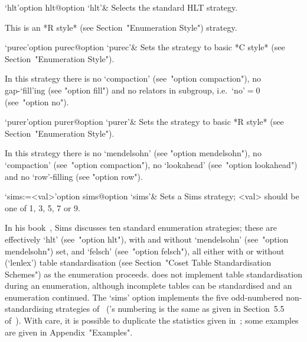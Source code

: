 \>`hlt'{option hlt}@{option `hlt'}&
Selects the standard HLT strategy.

This is an *R style* (see Section~"Enumeration Style") strategy.

\>`purec'{option purec}@{option `purec'}&
Sets the strategy to basic *C style* (see Section~"Enumeration  Style").

In this strategy there is no `compaction'  (see~"option  compaction"),
no gap-`fill'ing (see "option fill")  and  no  relators  in  subgroup,
i.e.~`no'${}=0$ (see~"option no").

\>`purer'{option purer}@{option `purer'}&
Sets the strategy  to basic *R style* (see Section~"Enumeration  Style").

In this strategy there is no `mendelsohn' (see  "option  mendelsohn"),
no `compaction' (see~"option compaction"), no `lookahead' (see~"option
lookahead") and no `row'-filling (see "option row").

\>`sims:=<val>'{option sims}@{option `sims'}&
Sets a Sims strategy; <val> should be one of 1, 3, 5, 7 or 9.

In his book~\cite{Sim94},  Sims  discusses  ten  standard  enumeration
strategies; these are effectively `hlt' (see~"option hlt"),  with  and
without  `mendelsohn'  (see~"option  mendelsohn")  set,  and  `felsch'
(see~"option felsch"), all either with  or  without  (`lenlex')  table
standardisation (see Section~"Coset Table Standardisation Schemes") as
the  enumeration   proceeds.   {\ACE}   does   not   implement   table
standardisation during an enumeration, although incomplete tables  can
be standardised  and  an  enumeration  continued.  The  `sims'  option
implements  the   five   odd-numbered   non-standardising   strategies
of~\cite{Sim94}  ({\ACE}'s  numbering  is  the  same   as   given   in
Section~5.5 of~\cite{Sim94}). With care, it is possible  to  duplicate
the statistics given  in~\cite{Sim94};  some  examples  are  given  in
Appendix~"Examples".

\enditems

